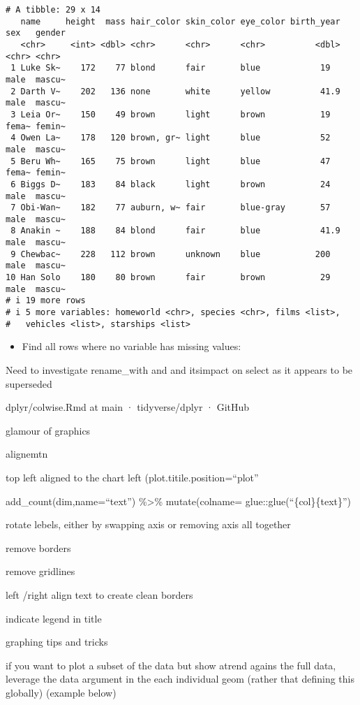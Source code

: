 \documentclass[
  letterpaper,
  DIV=11,
  numbers=noendperiod]{scrreprt}
\providecommand{\tightlist}{%
  \setlength{\itemsep}{0pt}\setlength{\parskip}{0pt}}\usepackage{longtable,booktabs,array}
\begin{document}
\begin{verbatim}
# A tibble: 29 x 14
   name     height  mass hair_color skin_color eye_color birth_year sex   gender
   <chr>     <int> <dbl> <chr>      <chr>      <chr>          <dbl> <chr> <chr> 
 1 Luke Sk~    172    77 blond      fair       blue            19   male  mascu~
 2 Darth V~    202   136 none       white      yellow          41.9 male  mascu~
 3 Leia Or~    150    49 brown      light      brown           19   fema~ femin~
 4 Owen La~    178   120 brown, gr~ light      blue            52   male  mascu~
 5 Beru Wh~    165    75 brown      light      blue            47   fema~ femin~
 6 Biggs D~    183    84 black      light      brown           24   male  mascu~
 7 Obi-Wan~    182    77 auburn, w~ fair       blue-gray       57   male  mascu~
 8 Anakin ~    188    84 blond      fair       blue            41.9 male  mascu~
 9 Chewbac~    228   112 brown      unknown    blue           200   male  mascu~
10 Han Solo    180    80 brown      fair       brown           29   male  mascu~
# i 19 more rows
# i 5 more variables: homeworld <chr>, species <chr>, films <list>,
#   vehicles <list>, starships <list>
\end{verbatim}

\begin{itemize}
\tightlist
\item
  Find all rows where no variable has missing values:
\end{itemize}

Need to investigate rename\_with and and itsimpact on select as it
appears to be superseded

dplyr/colwise.Rmd at main · tidyverse/dplyr · GitHub

glamour of graphics

alignemtn

top left aligned to the chart left (plot.titile.position=``plot''

add\_count(dim,name=``text'') \%\textgreater\% mutate(colname=
glue::glue(``\{col\}\{text\}'')

rotate lebels, either by swapping axis or removing axis all together

remove borders

remove gridlines

left /right align text to create clean borders

indicate legend in title

graphing tips and tricks

if you want to plot a subset of the data but show atrend agains the full
data, leverage the data argument in the each individual geom (rather
that defining this globally) (example below)
\end{document}
